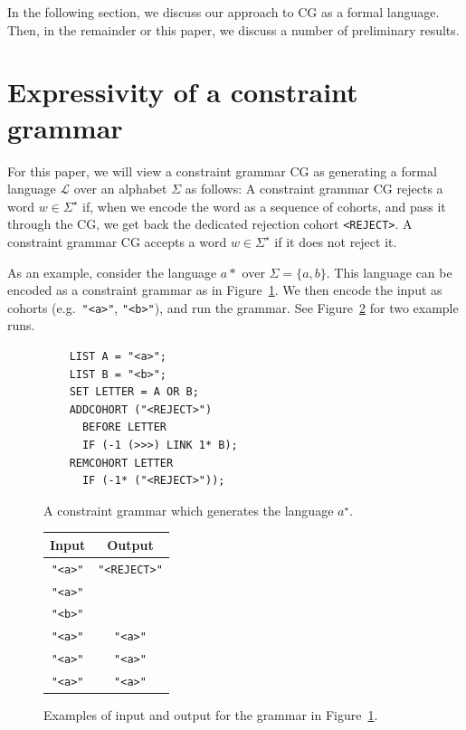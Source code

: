 \documentclass[11pt]{article}
\def\t#1{\texttt{#1}}
\begin{document}
In the following section, we discuss our approach to CG as a formal language.
Then, in the remainder or this paper, we discuss a number of preliminary
results.

\section{Expressivity of a constraint grammar}

For this paper, we will view a constraint grammar CG as generating a formal
language $\mathcal{L}$ over an alphabet $\Sigma$ as follows:
A constraint grammar CG rejects a word $w \in \Sigma^\star$ if, when we encode
the word as a sequence of cohorts, and pass it through the CG, we get back the
dedicated rejection cohort \texttt{<REJECT>}. A constraint grammar CG accepts a
word $w \in \Sigma^\star$ if it does not reject it. 

As an example, consider the language $a*$ over $\Sigma = \{a,b\}$. This language
can be encoded as a constraint grammar as in Figure~\ref{fig:astar}. We then
encode the input as cohorts (e.g.\ \t{"<a>"}, \t{"<b>"}), and run the grammar.
See Figure~\ref{fig:astario} for two example runs.

\begin{figure}[h]
  \begin{lstlisting}
    LIST A = "<a>";
    LIST B = "<b>";
    SET LETTER = A OR B;
    ADDCOHORT ("<REJECT>")
      BEFORE LETTER 
      IF (-1 (>>>) LINK 1* B);
    REMCOHORT LETTER
      IF (-1* ("<REJECT>"));
  \end{lstlisting}
  \caption{A constraint grammar which generates the language $a^\star$.}
  \label{fig:astar}
\end{figure}

\begin{figure}[h]
  \centering
  \begin{tabular}{c|c}
    \textbf{Input} & \textbf{Output} \\ \hline
    \t{"<a>"}      & \t{"<REJECT>"} \\
    \t{"<a>"}      \\
    \t{"<b>"}      \\ \hline
    \t{"<a>"}      & \t{"<a>"} \\
    \t{"<a>"}      & \t{"<a>"} \\
    \t{"<a>"}      & \t{"<a>"}
  \end{tabular}
  \caption{Examples of input and output for the grammar in
    Figure~\ref{fig:astar}.}  
  \label{fig:astario}
\end{figure}
\end{document}
